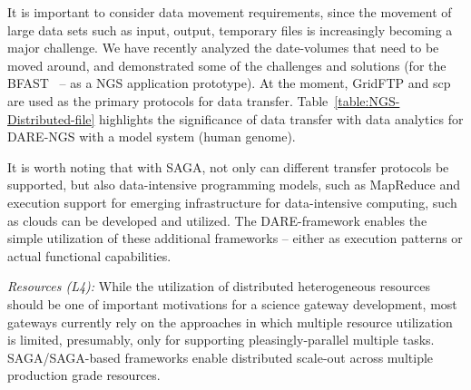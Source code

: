 \documentclass[]{article}
\begin{document}
It is important to consider data movement requirements, since the
movement of large data sets such as input, output, temporary files is
increasingly becoming a major challenge. We have recently analyzed the
date-volumes that need to be moved around, and demonstrated some of
the challenges and solutions (for the BFAST~\cite{ecmls11} -- as a NGS
application prototype).  At the moment, GridFTP and scp are used as
the primary protocols for data
transfer. Table~\ref{table:NGS-Distributed-file} highlights the
significance of data transfer with data analytics for DARE-NGS with a
model system (human genome).

It is worth noting that with SAGA, not only can different transfer
protocols be supported, but also data-intensive programming models,
such as MapReduce and execution support for emerging infrastructure
for data-intensive computing, such as clouds can be developed and
utilized\cite{abstractions-azure,saga-ccgrid10}.  The DARE-framework
enables the simple utilization of these additional frameworks --
either as execution patterns or actual functional capabilities.






\textit{Resources (L4):}    While the utilization of distributed
heterogeneous resources should be one of important motivations for a
science gateway development, most gateways currently rely on the
approaches in which multiple resource utilization is limited,
presumably, only for supporting pleasingly-parallel multiple tasks.
SAGA/SAGA-based frameworks enable distributed scale-out across
multiple production grade resources.
\end{document}
